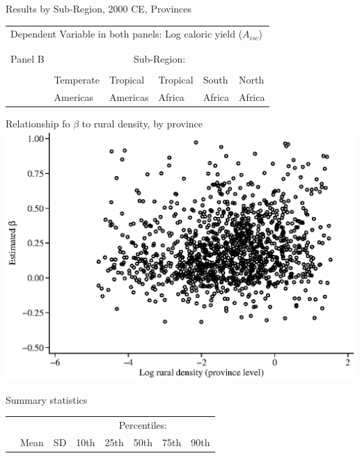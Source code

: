 \documentclass[10pt, xcolor=dvipsnames]{beamer}
\begin{document}
\begin{frame}{Results by Sub-Region, 2000 CE, Provinces}

{\scriptsize
\begin{tabularx}{\textwidth}{lXXXXX}
\midrule
\multicolumn{6}{l}{Dependent Variable in both panels: Log caloric yield ($A_{isc}$)} \\ \\
\\
Panel B & \multicolumn{5}{c}{Sub-Region:} \\ \cmidrule{2-6}
 &           &   &           &          &             \\
 & Temperate & Tropical  & Tropical & South    & North    \\
 & Americas  & Americas  & Africa   & Africa   & Africa     \\
\midrule

\midrule
\end{tabularx}
}

\hfill \hyperlink{robustness}{}
\end{frame}

\begin{frame}{Relationship fo $\beta$ to rural density, by province}\label{rurdbeta}
\includegraphics[width=.8\textwidth]{fig_beta_rurd.eps}
\hfill \hyperlink{eos}{}
\end{frame}

\begin{frame}{Summary statistics}\label{stats}
{\scriptsize
\begin{tabularx}{\textwidth}{lXXXXXXX}
\midrule
 &      &            & \multicolumn{5}{c}{Percentiles:} \\ \cmidrule{4-8}
 & Mean & SD  & 10th    & 25th    & 50th & 75th & 90th \\
\midrule

\midrule
\end{tabularx}
}

\hfill \hyperlink{data}{}
\end{frame}
\end{document}
